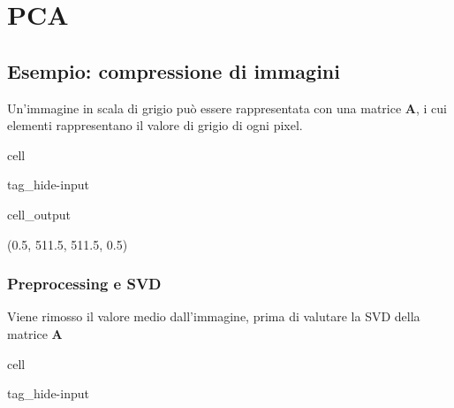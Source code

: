 \documentclass[letterpaper,10pt,italian]{jupyterBook}
\begin{document}
\sphinxstepscope


\section{PCA}
\label{\detokenize{ch/ai/pca:pca}}\label{\detokenize{ch/ai/pca:ia-ul-pca}}\label{\detokenize{ch/ai/pca::doc}}

\subsection{Esempio: compressione di immagini}
\label{\detokenize{ch/ai/pca:esempio-compressione-di-immagini}}
\sphinxAtStartPar
Un’immagine in scala di grigio può essere rappresentata con una matrice \(\mathbf{A}\), i cui elementi rappresentano il valore di grigio di ogni pixel.

\begin{sphinxuseclass}{cell}
\begin{sphinxuseclass}{tag_hide-input}\begin{sphinxVerbatimOutput}

\begin{sphinxuseclass}{cell_output}
\begin{sphinxVerbatim}[commandchars=\\\{\}]
(\PYGZhy{}0.5, 511.5, 511.5, \PYGZhy{}0.5)
\end{sphinxVerbatim}

\noindent{}

\end{sphinxuseclass}\end{sphinxVerbatimOutput}

\end{sphinxuseclass}
\end{sphinxuseclass}

\subsubsection{Preprocessing e SVD}
\label{\detokenize{ch/ai/pca:preprocessing-e-svd}}
\sphinxAtStartPar
Viene rimosso il valore medio dall’immagine, prima di valutare la SVD della matrice \(\mathbf{A}\)

\begin{sphinxuseclass}{cell}
\begin{sphinxuseclass}{tag_hide-input}
\end{sphinxuseclass}
\end{sphinxuseclass}
\end{document}
